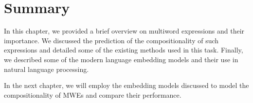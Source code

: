 \section{Summary}
In this chapter, we provided a brief overview on multiword expressions and their importance. We discussed the prediction of the compositionality of such expressions and detailed some of the existing methods used in this task. Finally, we described some of the modern language embedding models and their use in natural language processing.

In the next chapter, we will employ the embedding models discussed to model the compositionality of MWEs and compare their performance.

